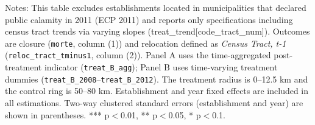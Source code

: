 \begin{table}[htb]
{\begin{threeparttable}
   	\begin{tablenotes}[flushleft] \item \small Notes: This table excludes establishments located in municipalities that declared public calamity in 2011 (ECP 2011) and reports only specifications including census tract trends via varying slopes (treat\_trend[code\_tract\_num]). Outcomes are closure (\texttt{morte}, column (1)) and relocation defined as \textit{Census Tract, t-1} (\texttt{reloc\_tract\_tminus1}, column (2)). Panel A uses the time-aggregated post-treatment indicator (\texttt{treat\_B\_agg}); Panel B uses time-varying treatment dummies (\texttt{treat\_B\_2008}--\texttt{treat\_B\_2012}). The treatment radius is 0--12.5 km and the control ring is 50--80 km. Establishment and year fixed effects are included in all estimations. Two-way clustered standard errors (establishment and year) are shown in parentheses. *** p$<$0.01, ** p$<$0.05, * p$<$0.1.
   	\end{tablenotes}
   	\end{threeparttable}
   	}
\end{table}%
